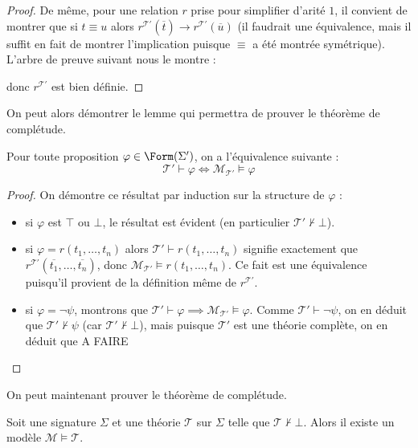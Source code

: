 \begin{proof}
  De même, pour une relation $r$ prise pour simplifier d'arité $1$, il convient
  de montrer que si $t\equiv u$ alors
  $r^{\mathcal T'}(\overline t)\to r^{\mathcal T'}(\overline u)$ (il faudrait une
  équivalence, mais il suffit en fait de montrer l'implication puisque $\equiv$
  a été montrée symétrique). L'arbre de preuve suivant nous le montre :
  \begin{prooftree}
  \end{prooftree}
  donc $r^{\mathcal T'}$ est bien définie.
\end{proof}

On peut alors démontrer le lemme qui permettra de prouver le théorème de
complétude.

\begin{lemma}
  Pour toute proposition $\varphi \in \Form(\Sigma')$, on a l'équivalence
  suivante :
  \[\mathcal T' \vdash \varphi \iff \mathcal M_{\mathcal T'}\models \varphi\]
\end{lemma}

\begin{proof}
  On démontre ce résultat par induction sur la structure de $\varphi$ :
  \begin{itemize}
  \item si $\varphi$ est $\top$ ou $\bot$, le résultat est évident (en
    particulier $\mathcal T'\not\vdash\bot$).
  \item si $\varphi = r(t_1,\ldots,t_n)$ alors
    $\mathcal T'\vdash r(t_1,\ldots,t_n)$ signifie exactement que
    $r^{\mathcal T'}(\overline{t_1},\ldots,\overline{t_n})$, donc
    $\mathcal M_{\mathcal T'}\models r(t_1,\ldots,t_n)$. Ce fait est une équivalence
    puisqu'il provient de la définition même de $r^{\mathcal T'}$.
  \item si $\varphi = \lnot \psi$, montrons que
    $\mathcal T'\vdash\varphi\implies \mathcal M_{\mathcal T'}\models \varphi$.
    Comme $\mathcal T'\vdash \lnot \psi$, on en déduit que
    $\mathcal T'\not\vdash \psi$ (car $\mathcal T'\not\vdash\bot$), mais puisque
    $\mathcal T'$ est une théorie complète, on en déduit que A FAIRE
  \end{itemize}
\end{proof}

On peut maintenant prouver le théorème de complétude.

\begin{theorem}
  Soit une signature $\Sigma$ et une théorie $\mathcal T$ sur $\Sigma$ telle que
  $\mathcal T\not\vdash\bot$. Alors il existe un modèle
  $\mathcal M\models \mathcal T$.
\end{theorem}

